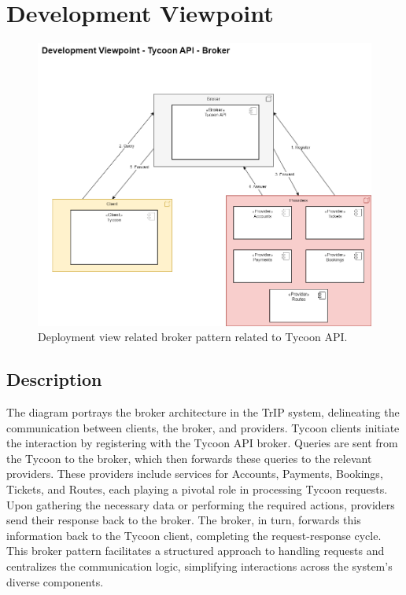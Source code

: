 \section{Development Viewpoint}

\begin{figure}[H]
    \centering
    \includegraphics[width=\textwidth]{drawings/views_final_version/development_view_broker.png}
    \caption{Deployment view related broker pattern related to Tycoon API.}
    \label{fig:development_view_broker}
\end{figure}

\subsection*{Description}
The diagram portrays the broker architecture in the TrIP system, delineating the communication between clients, the broker, and providers. Tycoon clients initiate the interaction by registering with the Tycoon API broker. Queries are sent from the Tycoon to the broker, which then forwards these queries to the relevant providers. These providers include services for Accounts, Payments, Bookings, Tickets, and Routes, each playing a pivotal role in processing Tycoon requests. Upon gathering the necessary data or performing the required actions, providers send their response back to the broker. The broker, in turn, forwards this information back to the Tycoon client, completing the request-response cycle. This broker pattern facilitates a structured approach to handling requests and centralizes the communication logic, simplifying interactions across the system’s diverse components.


